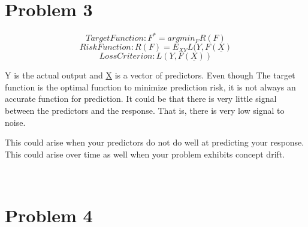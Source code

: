 \documentclass[11pt]{article}
\begin{document}
\begin{center}
\ \\
\end{center}

\section*{Problem 3}

$$Target Function: F^* = argmin_FR(F)$$
$$Risk Function: R(F) = E_{XY}L(Y, F(\underline{X})$$
$$Loss Criterion: L(Y,F(\underline{X}))$$

\vspace{5 mm}
\noindent
Y is the actual output and \underline{X} is a vector of predictors. Even though 
The target function is the optimal function to minimize prediction risk, it is 
not always an accurate function for prediction. It could be that there is very 
little signal between the predictors and the response. That is, there is very 
low signal to noise.

\vspace{5 mm}
\noindent
This could arise when your predictors do not do well at predicting your 
response. This could arise over time as well when your problem exhibits 
concept drift.

\newpage
\begin{center}
\ \\
\end{center}

\section*{Problem 4}
\end{document}
